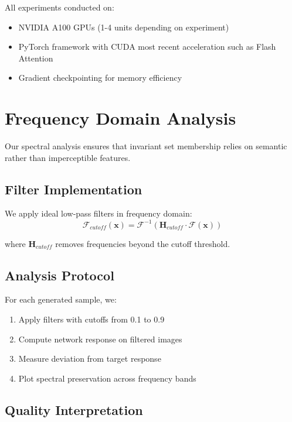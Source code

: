 \documentclass[licencjacka,en]{pracamgr}
\begin{document}
All experiments conducted on:
\begin{itemize}
\item NVIDIA A100 GPUs (1-4 units depending on experiment)
\item PyTorch framework with CUDA most recent  acceleration such as Flash Attention \citep{dao2022flashattention, dao2023flashattention2}
\item Gradient checkpointing for memory efficiency
\end{itemize}

\section{Frequency Domain Analysis}\label{appendix:frequency_analysis}

Our spectral analysis ensures that invariant set membership relies on semantic rather than imperceptible features.

\subsection{Filter Implementation}

We apply ideal low-pass filters in frequency domain:
\begin{equation}
\mathcal{F}_{cutoff}(\mathbf{x}) = \mathcal{F}^{-1}(\mathbf{H}_{cutoff} \cdot \mathcal{F}(\mathbf{x}))
\end{equation}

where $\mathbf{H}_{cutoff}$ removes frequencies beyond the cutoff threshold.

\subsection{Analysis Protocol}

For each generated sample, we:
\begin{enumerate}
\item Apply filters with cutoffs from 0.1 to 0.9
\item Compute network response on filtered images
\item Measure deviation from target response
\item Plot spectral preservation across frequency bands
\end{enumerate}

\subsection{Quality Interpretation}
\end{document}
